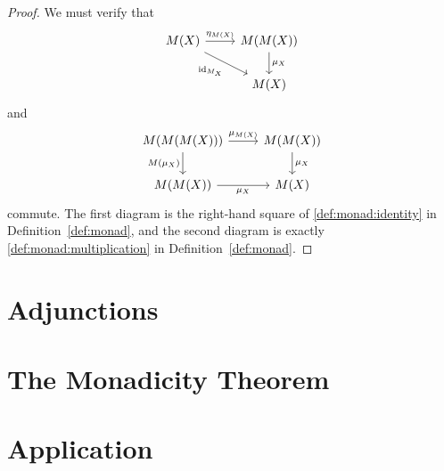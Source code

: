\documentclass{article}
\theoremstyle{definition}
\DeclareMathOperator{\id}{id}
\begin{document}
\begin{proof}
    We must verify that
    \[\begin{tikzcd}[ampersand replacement=\&]
    	M(X) \& {M(M(X))} \\
    	\& M(X)
    	\arrow["{\eta_{M(X)}}", from=1-1, to=1-2]
    	\arrow["\mu_X", from=1-2, to=2-2]
    	\arrow["\id_{M_X}"', from=1-1, to=2-2]
    \end{tikzcd}\]
    and
    \[\begin{tikzcd}[ampersand replacement=\&]
    	{M(M(M(X)))} \& {M(M(X))} \\
    	{M(M(X))} \& M(X)
    	\arrow["{\mu_{M(X)}}", from=1-1, to=1-2]
    	\arrow["\mu_X", from=1-2, to=2-2]
    	\arrow["{M(\mu_X)}"', from=1-1, to=2-1]
    	\arrow["\mu_X"', from=2-1, to=2-2]
    \end{tikzcd}\]
    commute. The first diagram is the right-hand square of \ref{def:monad:identity} in Definition~\ref{def:monad}, and the second diagram is exactly \ref{def:monad:multiplication} in Definition~\ref{def:monad}.
\end{proof}

\section{Adjunctions}

\section{The Monadicity Theorem}

\section{Application}
\end{document}
